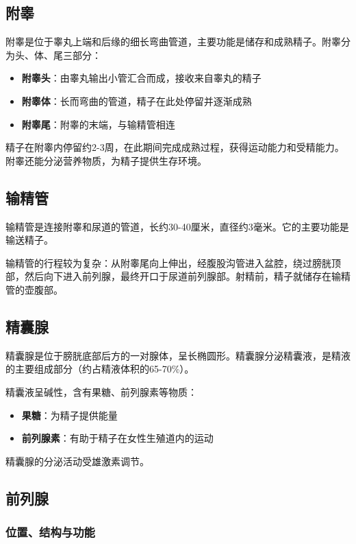 \subsection{附睾}

附睾是位于睾丸上端和后缘的细长弯曲管道，主要功能是储存和成熟精子。附睾分为头、体、尾三部分：
\begin{itemize}
    \item \textbf{附睾头}：由睾丸输出小管汇合而成，接收来自睾丸的精子
    \item \textbf{附睾体}：长而弯曲的管道，精子在此处停留并逐渐成熟
    \item \textbf{附睾尾}：附睾的末端，与输精管相连
\end{itemize}

精子在附睾内停留约2-3周，在此期间完成成熟过程，获得运动能力和受精能力。附睾还能分泌营养物质，为精子提供生存环境。

\subsection{输精管}

输精管是连接附睾和尿道的管道，长约30-40厘米，直径约3毫米。它的主要功能是输送精子。

输精管的行程较为复杂：从附睾尾向上伸出，经腹股沟管进入盆腔，绕过膀胱顶部，然后向下进入前列腺，最终开口于尿道前列腺部。射精前，精子就储存在输精管的壶腹部。

\subsection{精囊腺}

精囊腺是位于膀胱底部后方的一对腺体，呈长椭圆形。精囊腺分泌精囊液，是精液的主要组成部分（约占精液体积的65-70\%）。

精囊液呈碱性，含有果糖、前列腺素等物质：
\begin{itemize}
    \item \textbf{果糖}：为精子提供能量
    \item \textbf{前列腺素}：有助于精子在女性生殖道内的运动
\end{itemize}

精囊腺的分泌活动受雄激素调节。

\subsection{前列腺}
\subsubsection{位置、结构与功能}

